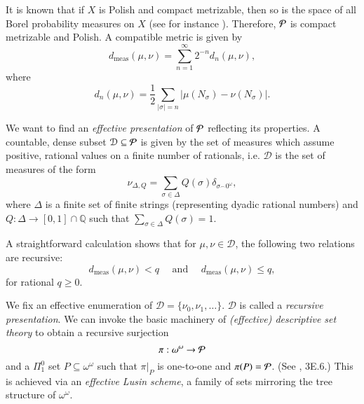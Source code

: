 \documentclass[11pt,reqno]{article}
\theoremstyle{plain}
\theoremstyle{definition}
\theoremstyle{remark}
\numberwithin{equation}{section}
\newcommand{\Rat}{\ensuremath{\mathbb{Q}}}
\newcommand{\Baire}{\ensuremath{\omega^{\omega}}}
\newcommand{\Cyl}[1]{\ensuremath{N_{#1}}}
\newcommand{\Conc}{\ensuremath{\mbox{}^\frown}}
\newcommand{\Pmeas}{\ensuremath{\CMcal{P}}}
\DeclareMathOperator{\meas}{meas}
\begin{document}
It is known that if $X$ is Polish and compact metrizable, then so is the space of all Borel  probability measures on $X$ (see for instance \citep{kechris:1995}). Therefore, 
$\Pmeas$ is compact metrizable and Polish. A compatible metric is given by
\[
	d_{\meas}(\mu,\nu) = \sum_{n=1}^\infty 2^{-n} d_n(\mu,\nu),
\]
where
\[
	d_n(\mu,\nu) = \frac{1}{2} \sum_{|\sigma| = n} |\mu(\Cyl{\sigma}) - \nu(\Cyl{\sigma})|.
\]

We want to find an \emph{effective presentation} of $\Pmeas$ reflecting its properties. A countable, dense
subset $\mathcal{D} \subseteq \Pmeas$ is given by the set of measures which assume
positive, rational values on a finite number of rationals, i.e. $\mathcal{D}$ is the set
of measures of the form
\begin{equation*}
  \nu_{\Delta, Q} = \sum_{\sigma \in \Delta} Q(\sigma) \delta_{\sigma \Conc 0^\omega},
\end{equation*}
where $\Delta$ is a finite set of finite strings (representing dyadic rational numbers) and $Q: \Delta \to [0,1]\cap \Rat$ such that $\sum_{\sigma \in \Delta} Q(\sigma) = 1$.  

A straightforward calculation shows that for $\mu, \nu \in \mathcal{D}$, the following two relations are recursive:
\[
	d_{\meas}(\mu,\nu) < q \quad \text{ and } \quad d_{\meas}(\mu,\nu) \leq q, 
\]
for rational $q \geq 0$.

We fix an effective enumeration of $\mathcal{D} = \{\nu_0, \nu_1, \dots\}$. $\mathcal{D}$ is called a \emph{recursive presentation}. We can invoke the basic machinery of \emph{(effective) descriptive set theory} to obtain a recursive surjection
\[
	\pi: \Baire \to \Pmeas 
\]
and a $\Pi^0_1$ set $P \subseteq \Baire$ such that $\pi|_P$ is one-to-one and $\pi(P) = \Pmeas$. 
(See \citet{moschovakis:1980}, 3E.6.) This is achieved via an \emph{effective Lusin scheme}, a family of sets mirroring the tree structure of $\Baire$. 
\end{document}
